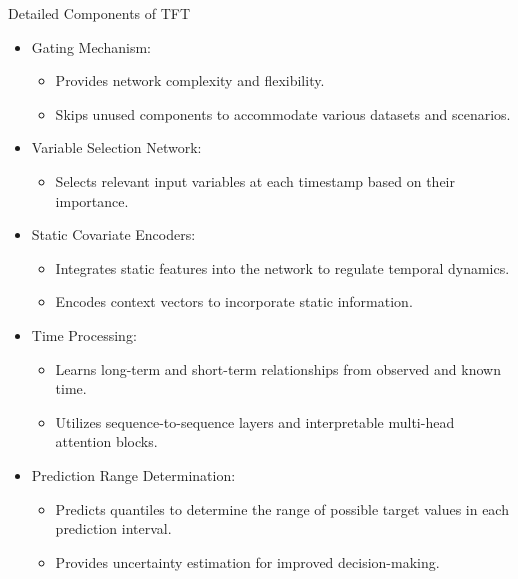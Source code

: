 \begin{frame}{Detailed Components of TFT}

\begin{itemize}
	\item Gating Mechanism:
	\begin{itemize}
		\item Provides network complexity and flexibility.
		\item Skips unused components to accommodate various datasets and scenarios.
	\end{itemize}
	
	\item Variable Selection Network:
	\begin{itemize}
		\item Selects relevant input variables at each timestamp based on their importance.
	\end{itemize}
	
	\item Static Covariate Encoders:
	\begin{itemize}
		\item Integrates static features into the network to regulate temporal dynamics.
		\item Encodes context vectors to incorporate static information.
	\end{itemize}
	\newpage
	\item Time Processing:
	\begin{itemize}
		\item Learns long-term and short-term relationships from observed and known time.
		\item Utilizes sequence-to-sequence layers and interpretable multi-head attention blocks.
	\end{itemize}
	
	\item Prediction Range Determination:
	\begin{itemize}
		\item Predicts quantiles to determine the range of possible target values in each prediction interval.
		\item Provides uncertainty estimation for improved decision-making.
	\end{itemize}
\end{itemize}
	
\end{frame}

	



